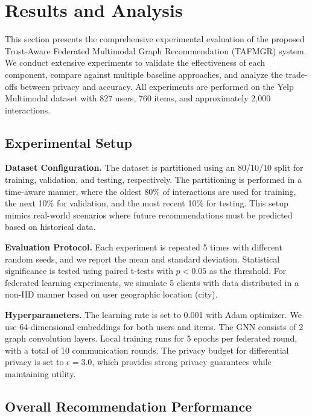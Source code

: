 
\section{Results and Analysis}
\label{sec:results}

This section presents the comprehensive experimental evaluation of the proposed Trust-Aware Federated Multimodal Graph Recommendation (TAFMGR) system. We conduct extensive experiments to validate the effectiveness of each component, compare against multiple baseline approaches, and analyze the trade-offs between privacy and accuracy. All experiments are performed on the Yelp Multimodal dataset with 827 users, 760 items, and approximately 2,000 interactions.

\subsection{Experimental Setup}
\label{subsec:setup}

\textbf{Dataset Configuration.} The dataset is partitioned using an 80/10/10 split for training, validation, and testing, respectively. The partitioning is performed in a time-aware manner, where the oldest 80\% of interactions are used for training, the next 10\% for validation, and the most recent 10\% for testing. This setup mimics real-world scenarios where future recommendations must be predicted based on historical data.

\textbf{Evaluation Protocol.} Each experiment is repeated 5 times with different random seeds, and we report the mean and standard deviation. Statistical significance is tested using paired t-tests with $p < 0.05$ as the threshold. For federated learning experiments, we simulate 5 clients with data distributed in a non-IID manner based on user geographic location (city).

\textbf{Hyperparameters.} The learning rate is set to 0.001 with Adam optimizer. We use 64-dimensional embeddings for both users and items. The GNN consists of 2 graph convolution layers. Local training runs for 5 epochs per federated round, with a total of 10 communication rounds. The privacy budget for differential privacy is set to $\epsilon = 3.0$, which provides strong privacy guarantees while maintaining utility.

\subsection{Overall Recommendation Performance}
\label{subsec:overall}

